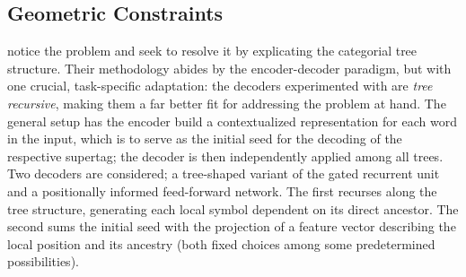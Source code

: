 \subsection{Geometric Constraints}
\label{subsection:gc}
\citet{prange-etal-2021-supertagging} notice the problem and seek to resolve it by explicating the categorial tree structure.
Their methodology abides by the encoder-decoder paradigm, but with one crucial, task-specific adaptation: the decoders experimented with are \textit{tree recursive}, making them a far better fit for addressing the problem at hand.
The general setup has the encoder build a contextualized representation for each word in the input, which is to serve as the initial seed for the decoding of the respective supertag; the decoder is then independently applied among all trees.
Two decoders are considered; a tree-shaped variant of the gated recurrent unit~\cite{cho2014properties} and a positionally informed feed-forward network.
The first recurses along the tree structure, generating each local symbol dependent on its direct ancestor.
The second sums the initial seed with the projection of a feature vector describing the local position and its ancestry (both fixed choices among some predetermined possibilities).

